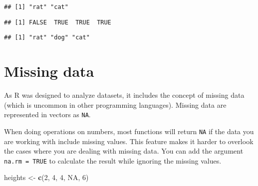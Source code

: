 \documentclass[]{book}
\newenvironment{Shaded}{\begin{snugshade}}{\end{snugshade}}
\newcommand{\KeywordTok}[1]{\textcolor[rgb]{0.13,0.29,0.53}{\textbf{#1}}}
\newcommand{\DecValTok}[1]{\textcolor[rgb]{0.00,0.00,0.81}{#1}}
\newcommand{\StringTok}[1]{\textcolor[rgb]{0.31,0.60,0.02}{#1}}
\newcommand{\OtherTok}[1]{\textcolor[rgb]{0.56,0.35,0.01}{#1}}
\newcommand{\OperatorTok}[1]{\textcolor[rgb]{0.81,0.36,0.00}{\textbf{#1}}}
\newcommand{\NormalTok}[1]{#1}
\begin{document}
\begin{verbatim}
## [1] "rat" "cat"
\end{verbatim}

\begin{Shaded}
\end{Shaded}

\begin{verbatim}
## [1] FALSE  TRUE  TRUE  TRUE
\end{verbatim}

\begin{Shaded}
\end{Shaded}

\begin{verbatim}
## [1] "rat" "dog" "cat"
\end{verbatim}

\section{Missing data}\label{missing-data}

As R was designed to analyze datasets, it includes the concept of
missing data (which is uncommon in other programming languages). Missing
data are represented in vectors as \texttt{NA}.

When doing operations on numbers, most functions will return \texttt{NA}
if the data you are working with include missing values. This feature
makes it harder to overlook the cases where you are dealing with missing
data. You can add the argument \texttt{na.rm\ =\ TRUE} to calculate the
result while ignoring the missing values.

\begin{Shaded}
\begin{Highlighting}[]
\NormalTok{heights <-}\StringTok{ }\KeywordTok{c}\NormalTok{(}\DecValTok{2}\NormalTok{, }\DecValTok{4}\NormalTok{, }\DecValTok{4}\NormalTok{, }\OtherTok{NA}\NormalTok{, }\DecValTok{6}\NormalTok{)}
\end{Highlighting}
\end{Shaded}
\end{document}
